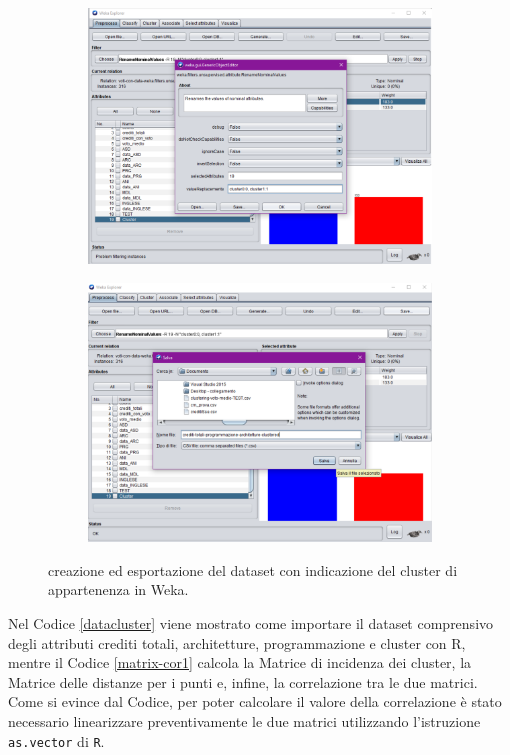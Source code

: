 \documentclass[12pt]{article}
\begin{document}
\begin{figure}
	\begin{subfigure}[b]{0.496\textwidth}
		\includegraphics[width=\textwidth]{img/save-cluster-ass-3.pdf}
		\end{subfigure}
		\begin{subfigure}[b]{0.496\textwidth}
		\includegraphics[width=\textwidth]{img/save-cluster-ass-4.pdf}
		\end{subfigure}
		\caption{creazione ed esportazione del dataset con indicazione del cluster di appartenenza in Weka.}
		\label{fig:add-cluster}
\end{figure}
\newpage
Nel Codice \ref{datacluster} viene mostrato come importare il dataset comprensivo degli attributi crediti totali, architetture, programmazione e cluster con R, mentre il Codice \ref{matrix-cor1} calcola la Matrice di incidenza dei cluster, la Matrice delle distanze per i punti e, infine, la correlazione tra le due matrici. Come si evince dal Codice, per poter calcolare il valore della correlazione è stato necessario linearizzare preventivamente le due matrici utilizzando l'istruzione \texttt{as.vector} di \texttt{R}.
\end{document}
